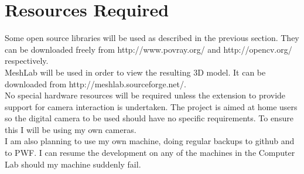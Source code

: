 \section*{Resources Required}
Some open source libraries will be used as described in the previous section. They can be downloaded freely from http://www.povray.org/ and http://opencv.org/ respectively.\\
MeshLab will be used in order to view the resulting 3D model. It can be downloaded from http://meshlab.sourceforge.net/.\\

No special hardware resources will be required unless the extension to provide support for camera interaction is undertaken. The project is aimed at home users so the digital camera to be used should have no specific requirements. To ensure this I will be using my own cameras.\\

I am also planning to use my own machine, doing regular backups to github and to PWF. I can resume the development on any of the machines in the Computer Lab should my machine suddenly fail. 

